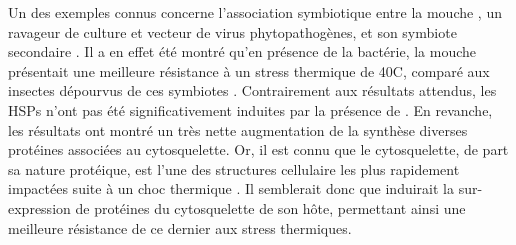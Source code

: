 

Un des exemples connus concerne l'association symbiotique entre la mouche , un ravageur de culture et vecteur de virus phytopathogènes, et son symbiote secondaire .
Il a en effet été montré qu'en présence de la bactérie, la mouche présentait une meilleure résistance à un stress thermique de 40\textdegree{}C, comparé aux insectes dépourvus de ces symbiotes \cite{brumin2011}.
Contrairement aux résultats attendus, les HSPs n'ont pas été significativement induites par la présence de .
En revanche, les résultats ont montré un très nette augmentation de la synthèse diverses protéines associées au cytosquelette.
Or, il est connu que le cytosquelette, de part sa nature protéique, est l'une des structures cellulaire les plus rapidement impactées suite à un choc thermique \cite{brumin2011}.
Il semblerait donc que  induirait la sur-expression de protéines du cytosquelette de son hôte, permettant ainsi une meilleure résistance de ce dernier aux stress thermiques.

